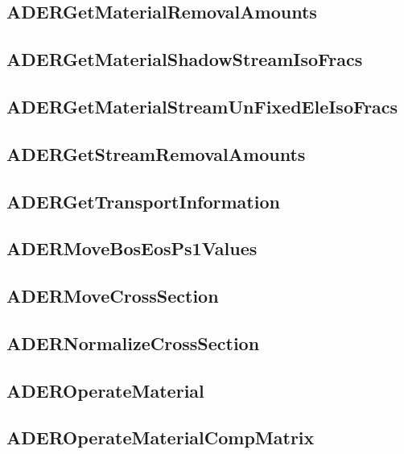 \subsection{ADERGetMaterialRemovalAmounts}


\subsection{ADERGetMaterialShadowStreamIsoFracs}


\subsection{ADERGetMaterialStreamUnFixedEleIsoFracs}


\subsection{ADERGetStreamRemovalAmounts}


\subsection{ADERGetTransportInformation}


\subsection{ADERMoveBosEosPs1Values}


\subsection{ADERMoveCrossSection}


\subsection{ADERNormalizeCrossSection}


\subsection{ADEROperateMaterial}


\subsection{ADEROperateMaterialCompMatrix}


